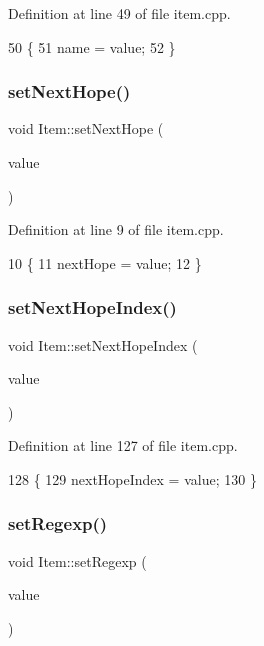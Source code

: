 Definition at line 49 of file item.\+cpp.


\begin{DoxyCode}
50 \{
51     name = value;
52 \}
\end{DoxyCode}
\mbox{\label{class_item_aeb4b7f6ae49089c37b4e83b60cdec1fc}} 
\subsubsection{\texorpdfstring{set\+Next\+Hope()}{setNextHope()}}
{\footnotesize\ttfamily void Item\+::set\+Next\+Hope (\begin{DoxyParamCaption}\item[{const Q\+List$<$ \hyperlink{class_item}{Item} $\ast$$>$ \&}]{value }\end{DoxyParamCaption})}



Definition at line 9 of file item.\+cpp.


\begin{DoxyCode}
10 \{
11     nextHope = value;
12 \}
\end{DoxyCode}
\mbox{\label{class_item_a433534d413597c7163d5cf51e94dfdd4}} 
\subsubsection{\texorpdfstring{set\+Next\+Hope\+Index()}{setNextHopeIndex()}}
{\footnotesize\ttfamily void Item\+::set\+Next\+Hope\+Index (\begin{DoxyParamCaption}\item[{int}]{value }\end{DoxyParamCaption})}



Definition at line 127 of file item.\+cpp.


\begin{DoxyCode}
128 \{
129     nextHopeIndex = value;
130 \}
\end{DoxyCode}
\mbox{\label{class_item_a7745fe1a00ad454eaaa8416ff88ea869}} 
\subsubsection{\texorpdfstring{set\+Regexp()}{setRegexp()}}
{\footnotesize\ttfamily void Item\+::set\+Regexp (\begin{DoxyParamCaption}\item[{const Q\+String \&}]{value }\end{DoxyParamCaption})}



